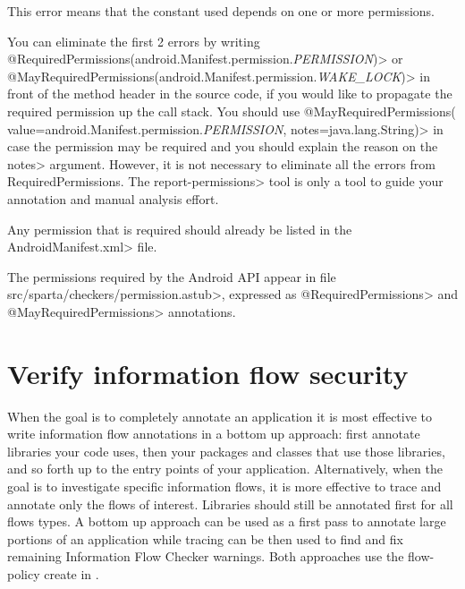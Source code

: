 This error means that the constant used depends on one or more permissions.

You can eliminate the first 2 errors by writing
\<@RequiredPermissions({android.Manifest.permission.\emph{PERMISSION}})> or
\<@MayRequiredPermissions({android.Manifest.permission.\emph{WAKE\_LOCK}})> in
front of the method header in the source code, if you would like to propagate the
required permission up the call stack. 
You should use 
\<@MayRequiredPermissions( value={android.Manifest.permission.\emph{PERMISSION}},
notes=java.lang.String)> in case the permission may be required and you should 
explain the reason on the \<notes> argument.
However, it is not necessary to eliminate all the errors from RequiredPermissions.   
The \<report-permissions> tool is only a tool to guide your annotation and manual analysis effort. 

Any permission that is required should already be listed in the
\<AndroidManifest.xml> file.

The permissions required by the Android API appear in file
\<src/sparta/checkers/permission.astub>, expressed as
\<@RequiredPermissions> and \<@MayRequiredPermissions> annotations.




\section{Verify information flow security\label{verify-information-flow-security}}

When the goal is to completely annotate an application it is
most effective to write information flow annotations in a bottom up approach:
first annotate libraries your code uses, then your packages and classes
that use those libraries, and so forth up to the entry points of your application.
Alternatively, when the goal is to investigate specific information flows, it is
more effective to trace and annotate only the flows of interest.
Libraries should still be annotated first for all flows types.
A bottom up approach can be used as a first pass to annotate large portions of an
application while tracing can be then used to find and fix remaining Information Flow Checker warnings.
Both approaches use the flow-policy create in .

